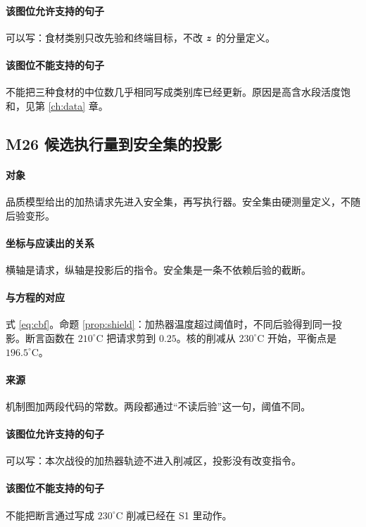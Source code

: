 \paragraph{该图位允许支持的句子}
可以写：食材类别只改先验和终端目标，不改 $\bm{z}$ 的分量定义。

\paragraph{该图位不能支持的句子}
不能把三种食材的中位数几乎相同写成类别库已经更新。原因是高含水段活度饱和，见第 \ref{ch:data} 章。

\subsection{M26 候选执行量到安全集的投影}
\paragraph{对象}
品质模型给出的加热请求先进入安全集，再写执行器。安全集由硬测量定义，不随后验变形。

\paragraph{坐标与应读出的关系}
横轴是请求，纵轴是投影后的指令。安全集是一条不依赖后验的截断。

\paragraph{与方程的对应}
式 \eqref{eq:cbf}。命题 \ref{prop:shield}：加热器温度超过阈值时，不同后验得到同一投影。断言函数在 $210^\circ\mathrm{C}$ 把请求剪到 $0.25$。核的削减从 $230^\circ\mathrm{C}$ 开始，平衡点是 $196.5^\circ\mathrm{C}$。

\paragraph{来源}
机制图加两段代码的常数。两段都通过“不读后验”这一句，阈值不同。

\paragraph{该图位允许支持的句子}
可以写：本次战役的加热器轨迹不进入削减区，投影没有改变指令。

\paragraph{该图位不能支持的句子}
不能把断言通过写成 $230^\circ\mathrm{C}$ 削减已经在 S1 里动作。

